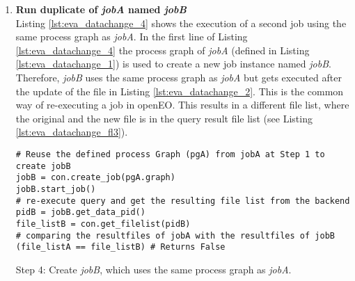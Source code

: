 \documentclass[draft,final]{vutinfth} %
\newenvironment{code}{\captionsetup{type=listing}}{}
\begin{document}
\begin{enumerate}
	\begin{code}
		\begin{verbatim}
{'timestamp': '2017-05-08 00:00:00', 
'path': '/eodc/products/copernicus.eu/s2a_prd_msil1c/2017/05/04/
S2A_MSIL1C_20170504T101031_N0205_R022_T32TPR_20170504T101349.zip'}, 
{'timestamp': '2017-05-08 00:00:00',
'path':'/eodc/products/copernicus.eu/s2a_prd_msil1c/2017/05/04/
S2A_MSIL1C_20170504T101031_N0205_R022_T32TQS_20170504T101349.zip', 
{'timestamp': '2017-05-08 00:00:00', 
'path': '/eodc/products/copernicus.eu/s2a_prd_msil1c/2017/05/04/
S2A_MSIL1C_20170504T101031_N0205_R022_T32TQR_20170504T101349.zip'}, 
{'timestamp': '2017-05-08 00:00:00',
'path':'/eodc/products/copernicus.eu/s2a_prd_msil1c/2017/05/04/
S2A_MSIL1C_20170504T101031_N0205_R022_T32TPT_20170504T101349.zip'},
...
		\end{verbatim}
		\caption{First four resulting files of the file list.}
		\label{lst:eva_datachange_rf3}
	\end{code}

	\item \textbf{Run duplicate of \textit{jobA} named \textit{jobB}} \\
	Listing \ref{lst:eva_datachange_4} shows the execution of a second job using the same process graph as \textit{jobA}. In the first line of Listing \ref{lst:eva_datachange_4} the process graph of \textit{jobA} (defined in Listing \ref{lst:eva_datachange_1}) is used to create a new job instance named \textit{jobB}. Therefore, \textit{jobB} uses the same process graph as \textit{jobA} but gets executed after the update of the file in Listing \ref{lst:eva_datachange_2}. This is the common way of re-executing a job in openEO. This results in a different file list, where the original and the new file is in the query result file list (see Listing \ref{lst:eva_datachange_fl3}).
	\begin{code}
		\begin{verbatim}
# Reuse the defined process Graph (pgA) from jobA at Step 1 to create jobB
jobB = con.create_job(pgA.graph)
jobB.start_job()
# re-execute query and get the resulting file list from the backend
pidB = jobB.get_data_pid()
file_listB = con.get_filelist(pidB)
# comparing the resultfiles of jobA with the resultfiles of jobB
(file_listA == file_listB) # Returns False
		\end{verbatim}
		\caption{Step 4: Create \textit{jobB}, which uses the same process graph as \textit{jobA}.}
		\label{lst:eva_datachange_4}
	\end{code}
	

\end{enumerate}
\end{document}
